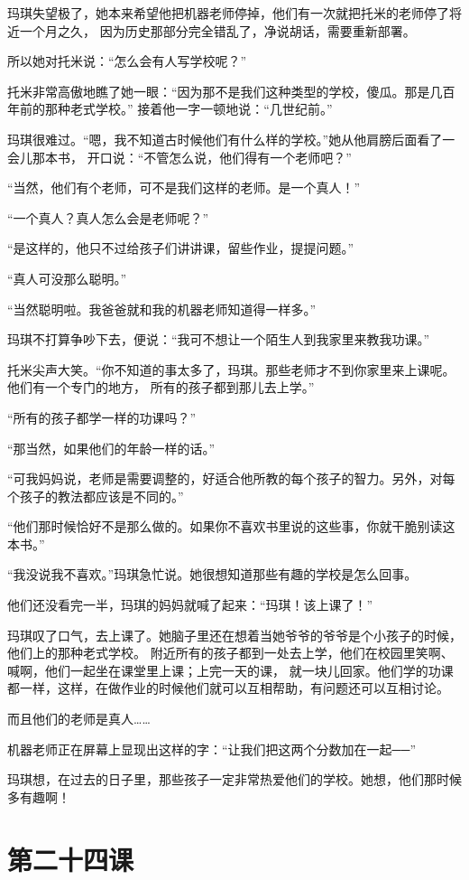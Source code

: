 \documentclass[12pt,UTF8]{ctexbook}
\begin{document}
玛琪失望极了，她本来希望他把机器老师停掉，他们有一次就把托米的老师停了将近一个月之久，
因为历史那部分完全错乱了，净说胡话，需要重新部署。

所以她对托米说：“怎么会有人写学校呢？”

托米非常高傲地瞧了她一眼：“因为那不是我们这种类型的学校，傻瓜。那是几百年前的那种老式学校。”
接着他一字一顿地说：“几世纪前。”

玛琪很难过。“嗯，我不知道古时候他们有什么样的学校。”她从他肩膀后面看了一会儿那本书，
开口说：“不管怎么说，他们得有一个老师吧？”

“当然，他们有个老师，可不是我们这样的老师。是一个真人！”

“一个真人？真人怎么会是老师呢？”

“是这样的，他只不过给孩子们讲讲课，留些作业，提提问题。”

“真人可没那么聪明。”

“当然聪明啦。我爸爸就和我的机器老师知道得一样多。”

玛琪不打算争吵下去，便说：“我可不想让一个陌生人到我家里来教我功课。”

托米尖声大笑。“你不知道的事太多了，玛琪。那些老师才不到你家里来上课呢。他们有一个专门的地方，
所有的孩子都到那儿去上学。”

“所有的孩子都学一样的功课吗？”

“那当然，如果他们的年龄一样的话。”

“可我妈妈说，老师是需要调整的，好适合他所教的每个孩子的智力。另外，对每个孩子的教法都应该是不同的。”

“他们那时候恰好不是那么做的。如果你不喜欢书里说的这些事，你就干脆别读这本书。”

“我没说我不喜欢。”玛琪急忙说。她很想知道那些有趣的学校是怎么回事。

他们还没看完一半，玛琪的妈妈就喊了起来：“玛琪！该上课了！”

玛琪叹了口气，去上课了。她脑子里还在想着当她爷爷的爷爷是个小孩子的时候，他们上的那种老式学校。
附近所有的孩子都到一处去上学，他们在校园里笑啊、喊啊，他们一起坐在课堂里上课；上完一天的课，
就一块儿回家。他们学的功课都一样，这样，在做作业的时候他们就可以互相帮助，有问题还可以互相讨论。

而且他们的老师是真人……

机器老师正在屏幕上显现出这样的字：“让我们把这两个分数加在一起──”

玛琪想，在过去的日子里，那些孩子一定非常热爱他们的学校。她想，他们那时候多有趣啊！

\section{第二十四课}
\end{document}
